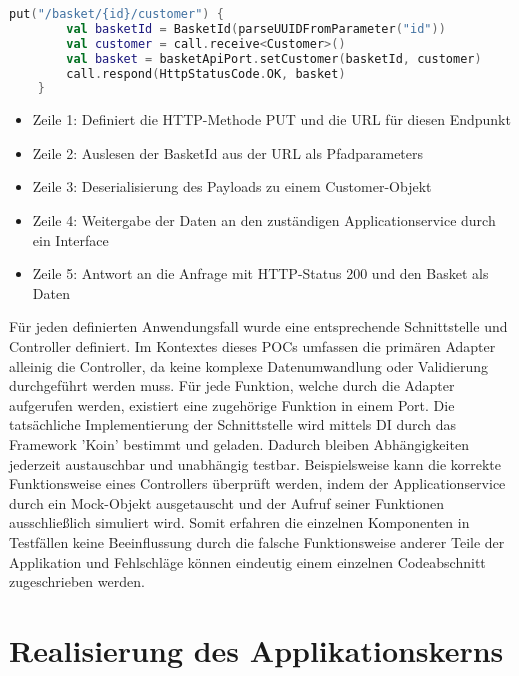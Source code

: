 \begin{minipage}{\linewidth} %
\begin{lstlisting}[caption={Beispiel eines Controllers zum aktualiseren von Kundendaten}, label={lst:controller}, language=Kotlin]
	put("/basket/{id}/customer") { 
		val basketId = BasketId(parseUUIDFromParameter("id")) 
		val customer = call.receive<Customer>()  
		val basket = basketApiPort.setCustomer(basketId, customer)
		call.respond(HttpStatusCode.OK, basket)
	}
\end{lstlisting}
\end{minipage}

\begin{itemize}[noitemsep,nolistsep]
	\item Zeile 1: Definiert die HTTP-Methode PUT und die URL für diesen Endpunkt
	\item Zeile 2: Auslesen der BasketId aus der URL als Pfadparameters 
	\item Zeile 3: Deserialisierung des Payloads zu einem Customer-Objekt
	\item Zeile 4: Weitergabe der Daten an den zuständigen Applicationservice durch ein Interface
	\item Zeile 5: Antwort an die Anfrage mit HTTP-Status 200 und den Basket als Daten
\end{itemize}

Für jeden definierten Anwendungsfall wurde eine entsprechende Schnittstelle und Controller definiert. Im Kontextes dieses POCs umfassen die primären Adapter alleinig die Controller, da keine komplexe Datenumwandlung oder Validierung durchgeführt werden muss. Für jede Funktion, welche durch die Adapter aufgerufen werden, existiert eine zugehörige Funktion in einem Port. Die tatsächliche Implementierung der Schnittstelle wird mittels \acrlong{DI} durch das Framework 'Koin' bestimmt und geladen. Dadurch bleiben Abhängigkeiten jederzeit austauschbar und unabhängig testbar. Beispielsweise kann die korrekte Funktionsweise eines Controllers überprüft werden, indem der Applicationservice durch ein Mock-Objekt ausgetauscht und der Aufruf seiner Funktionen ausschließlich simuliert wird. Somit erfahren die einzelnen Komponenten in Testfällen keine Beeinflussung durch die falsche Funktionsweise anderer Teile der Applikation und Fehlschläge können eindeutig einem einzelnen Codeabschnitt zugeschrieben werden.



\section{Realisierung des Applikationskerns}

